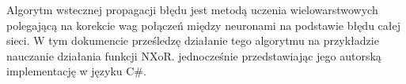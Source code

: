 Algorytm wstecznej propagacji błędu jest metodą uczenia wielowarstwowych polegającą na korekcie wag połączeń między neuronami na podstawie błędu całej sieci.
W tym dokumencie prześledzę działanie tego algorytmu na przykładzie nauczanie działania funkcji NXoR.
jednocześnie przedstawiając jego autorską implementację w języku C\#.